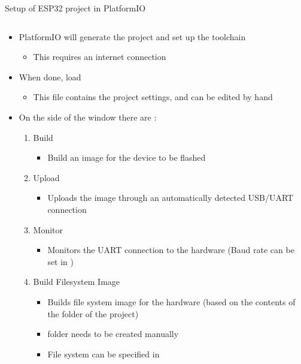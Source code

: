 \documentclass[aspectratio=169]{beamer}
\begin{document}
\begin{frame}{Setup of ESP32 project in PlatformIO}
\begin{columns}
	\begin{column}{0.5\textwidth}
		\begin{textBox}
			\begin{itemize}
				\item PlatformIO will generate the project and set up the toolchain
				\begin{itemize}
					\item This requires an internet connection
				\end{itemize}
				\item When done, load 
				\begin{itemize}
					\item This file contains the project settings, and can be edited by hand
				\end{itemize}
				\item On the side of the window there are :
				\begin{enumerate}
					\item Build
					\begin{itemize}
						\item Build an image for the device to be flashed
					\end{itemize}
					\item Upload
					\begin{itemize}
						\item Uploads the image through an automatically detected USB/UART connection
					\end{itemize}
					\item Monitor
					\begin{itemize}
						\item Monitors the UART connection to the hardware (Baud rate can be set in )
					\end{itemize}
					\item Build Filesystem Image
					\begin{itemize}
						\item Builds file system image for the hardware  (based on the contents of the  folder of the project)
						\item {} folder needs to be created manually
						\item File system can be specified in 
					\end{itemize}

\end{enumerate}
\end{itemize}
\end{textBox}
\end{column}
\end{columns}
\end{frame}
\end{document}
